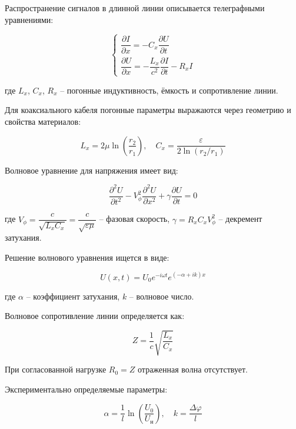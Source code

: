 \documentclass[a4paper]{article}
\begin{document}
Распространение сигналов в длинной линии описывается телеграфными уравнениями:

\begin{equation}
\begin{cases}
    \dfrac{\partial I}{\partial x} = -C_x \dfrac{\partial U}{\partial t} \\
    \dfrac{\partial U}{\partial x} = -\dfrac{L_x}{c^2} \dfrac{\partial I}{\partial t} - R_x I
\end{cases}
\end{equation}

где $L_x$, $C_x$, $R_x$ -- погонные индуктивность, ёмкость и сопротивление линии.

Для коаксиального кабеля погонные параметры выражаются через геометрию и свойства материалов:

\begin{equation}
L_x = 2\mu\ln\left(\frac{r_2}{r_1}\right), \quad 
C_x = \frac{\varepsilon}{2\ln(r_2/r_1)}
\end{equation}

Волновое уравнение для напряжения имеет вид:

\begin{equation}
\frac{\partial^2 U}{\partial t^2} - V_{\phi}^2 \frac{\partial^2 U}{\partial x^2} + \gamma \frac{\partial U}{\partial t} = 0
\end{equation}

где $V_{\phi} = \dfrac{c}{\sqrt{L_x C_x}} = \dfrac{c}{\sqrt{\varepsilon\mu}}$ -- фазовая скорость, $\gamma = R_x C_x V_{\phi}^2$ -- декремент затухания.

Решение волнового уравнения ищется в виде:

\begin{equation}
U(x,t) = U_0 e^{-i\omega t} e^{(-\alpha + ik)x}
\end{equation}

где $\alpha$ -- коэффициент затухания, $k$ -- волновое число.

Волновое сопротивление линии определяется как:

\begin{equation}
Z = \frac{1}{c}\sqrt{\frac{L_x}{C_x}}
\end{equation}

При согласованной нагрузке $R_0 = Z$ отраженная волна отсутствует.

Экспериментально определяемые параметры:

\begin{equation}
\alpha = \frac{1}{l}\ln\left(\frac{U_0}{U_\text{н}}\right), \quad 
k = \frac{\Delta \varphi}{l}
\end{equation}
\end{document}
